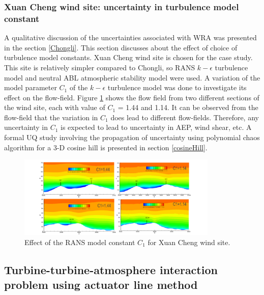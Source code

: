 \documentclass[]{aiaa-tc}%
\begin{document}
\subsubsection{Xuan Cheng wind site: uncertainty in turbulence model constant}

A qualitative discussion of the uncertainties associated with WRA was presented in the section \ref{Chongli}. This section discusses about the effect of choice of turbulence model constants. Xuan Cheng wind site is chosen for the case study. This site is relatively simpler compared to Chongli, so RANS $k - \epsilon$  turbulence model and neutral ABL atmospheric stability model were used. A variation of the model parameter $C_1$ of the $k - \epsilon$  turbulence model was done to investigate its effect on the flow-field. Figure \ref{f:XuanCheng_C1} shows the flow field from two different sections of the wind site, each with value of $C_1$ = 1.44 and 1.14. It can be observed from the flow-field that the variation in $C_1$ does lead to different flow-fields. Therefore, any uncertainty in $C_1$ is expected to lead to uncertainty in AEP, wind shear, etc. A formal UQ study involving the propagation of uncertainty using polynomial chaos algorithm for a 3-D cosine hill is presented in section \ref{cosineHill}.

\begin{figure}
\centering
 \includegraphics[width=0.85\textwidth]{XuanCheng_C1_Effect.png}
 \caption{Effect of the RANS model constant $C_1$ for Xuan Cheng wind site.}
 \label{f:XuanCheng_C1}
\end{figure}


\subsection{Turbine-turbine-atmosphere interaction problem using actuator line method} \label{abl_alm}
\end{document}
